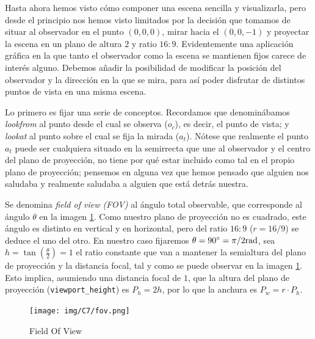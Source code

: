 Hasta ahora hemos visto cómo componer una escena sencilla y visualizarla, pero desde el principio nos hemos visto limitados por la decisión que tomamos de situar al observador en el punto $(0,0,0)$, mirar hacia el $(0,0,-1)$ y proyectar la escena en un plano de altura $2$ y ratio $16:9$. Evidentemente una aplicación gráfica en la que tanto el observador como la escena se mantienen fijos carece de interés alguno. Debemos añadir la posibilidad de modificar la posición del observador y la dirección en la que se mira, para así poder disfrutar de distintos puntos de vista en una misma escena.

Lo primero es fijar una serie de conceptos. Recordamos que denominábamos \textit{lookfrom} al punto desde el cual se observa ($o_c$), es decir, el punto de vista; y \textit{lookat} al punto sobre el cual se fija la mirada ($a_t$). Nótese que realmente el punto $a_t$ puede ser cualquiera situado en la semirrecta que une al observador y el centro del plano de proyección, no tiene por qué estar incluido como tal en el propio plano de proyección; pensemos en alguna vez que hemos pensado que alguien nos saludaba y realmente saludaba a alguien que está detrás nuestra.

Se denomina \textit{field of view (FOV)} al ángulo total observable, que corresponde al ángulo $\theta$ en la imagen \ref{fig:fov}. Como nuestro plano de proyección no es cuadrado, este ángulo es distinto en vertical y en horizontal, pero del ratio $16:9$ ($r=16/9$) se deduce el uno del otro. En nuestro caso fijaremos $\theta=90^\circ=\pi/2 \mathrm{rad}$, sea $h=\tan\left(\frac \theta 2\right)=1$ el ratio constante que van a mantener la semialtura del plano de proyección y la distancia focal, tal y como se puede observar en la imagen \ref{fig:fov}. Esto implica, asumiendo una distancia focal de $1$, que la altura del plano de proyección (\verb|viewport_height|) es $P_h=2h$, por lo que la anchura es $P_w=r\cdot P_h$. 

\begin{figure} [ht]
    \centering
    \texttt{[image: img/C7/fov.png]}
    \caption{Field Of View}
    \label{fig:fov}
\end{figure}

